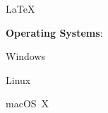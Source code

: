 \documentclass{resume}
\begin{document}
\begin{multicols}{3}
\begin{multicols}{2}
\begin{loneinnerlist}
				\item \LaTeX
			\end{loneinnerlist}
		\end{multicols}
		\columnbreak
		\textbf{Operating Systems}:
		\begin{multicols}{1}
			\begin{loneinnerlist}
				\item Windows
				\item Linux
				\item macOS~X
				\item[]
				\item[]
			\end{loneinnerlist}
		\end{multicols}%
	\end{multicols}%
	\vspace*{0.25\baselineskip}
\end{document}
